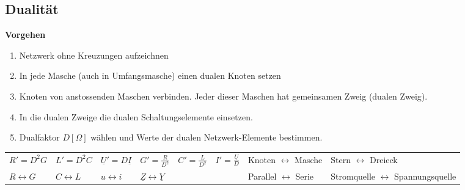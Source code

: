 \subsection{Dualität}
\textbf{Vorgehen}
\begin{enumerate}{\setlength{\itemsep}{0cm}\setlength{\parsep}{0cm} \setlength{\topsep}{0cm}}
	\item Netzwerk ohne Kreuzungen aufzeichnen
	\item In jede Masche (auch in Umfangsmasche) einen dualen Knoten setzen
	\item Knoten von anstossenden Maschen verbinden. Jeder dieser Maschen hat
	gemeinsamen Zweig (dualen Zweig).
	\item In die dualen Zweige die dualen Schaltungselemente einsetzen.
	\item Dualfaktor $D [\Omega]$ wählen und Werte der dualen Netzwerk-Elemente
	bestimmen.
\end{enumerate}

\begin{tabular}{llllllll}
$R'=D^2G$ & $L'=D^2C$ & $\underline{U}'=D\underline{I}$ & $G'=\frac{R}{D^2}$ &
$C'=\frac{L}{D^2}$ & $I'=\frac{\underline{U}}{D}$ & Knoten $\leftrightarrow$
Masche & Stern $\leftrightarrow$ Dreieck \\
$R \leftrightarrow G $ & $C \leftrightarrow L$ & $u \leftrightarrow i$ &
$\underline{Z} \leftrightarrow \underline{Y}$ & & & Parallel $\leftrightarrow$
Serie & Stromquelle $\leftrightarrow$ Spannungsquelle\\
\end{tabular}

